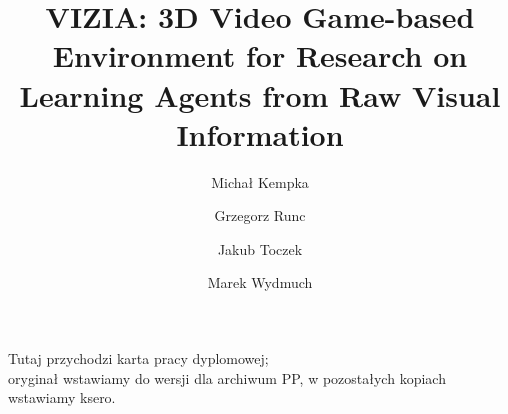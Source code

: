 \documentclass[english,bachelor,a4paper,twoside]{ppfcmthesis}
\author{%
   Michał Kempka \album{105256} \and 
   Grzegorz Runc \album{109759} \and 
   Jakub Toczek \album{109704} \and 
   Marek Wydmuch \album{109746}}
\title{VIZIA: 3D Video Game-based Environment for Research on Learning Agents from Raw Visual Information}        %
\begin{document}
\frontmatter\pagestyle{empty}%
\maketitle\cleardoublepage%

\thispagestyle{empty}\vspace*{\fill}%
\begin{center}Tutaj przychodzi karta pracy dyplomowej;\\oryginał wstawiamy do wersji dla archiwum PP, w pozostałych kopiach wstawiamy ksero.\end{center}%
\vfill\cleardoublepage%


\cleardoublepage

\pagestyle{ppfcmthesis}%
\tableofcontents* \cleardoublepage%

\mainmatter%










{\raggedright\sloppy\small}

\cleardoublepage\appendix%





\ppcolophon
\end{document}
